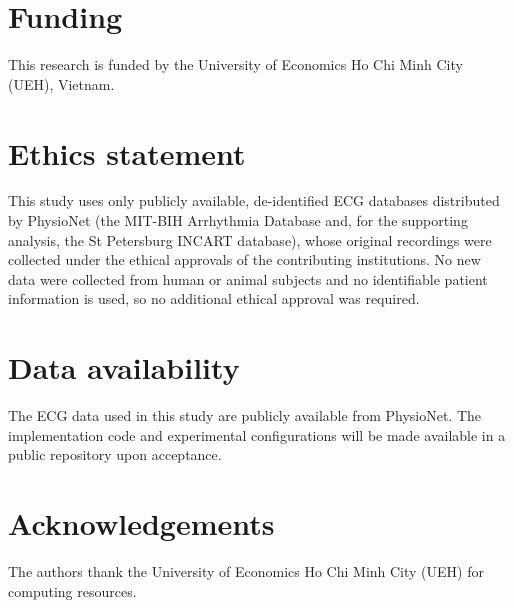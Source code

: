 \documentclass[review,12pt]{elsarticle}
\begin{document}
\section*{Funding}
This research is funded by the University of Economics Ho Chi Minh City (UEH),
Vietnam.

\section*{Ethics statement}
This study uses only publicly available, de-identified ECG databases distributed
by PhysioNet (the MIT-BIH Arrhythmia Database and, for the supporting analysis,
the St Petersburg INCART database), whose original recordings were collected
under the ethical approvals of the contributing institutions. No new data were
collected from human or animal subjects and no identifiable patient information
is used, so no additional ethical approval was required.

\section*{Data availability}
The ECG data used in this study are publicly available from PhysioNet. The
implementation code and experimental configurations will be made available in a
public repository upon acceptance.

\section*{Acknowledgements}
The authors thank the University of Economics Ho Chi Minh City (UEH) for
computing resources.



\end{document}

